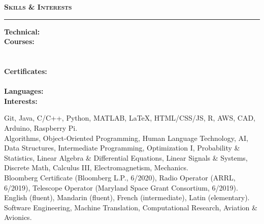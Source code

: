\documentclass[10pt, letterpaper]{article}
\begin{document}
\pagebreak
{\large \textbf{\textsc{Skills \& Interests}}}
\vspace{5pt}
\hrule
{}
\begin{paracol}{2}
\raggedleft
\textbf{Technical:}\\
\textbf{Courses:}\\~\\~\\
\textbf{Certificates:}\\~\\
\textbf{Languages:}\\
\textbf{Interests:}\\
\switchcolumn
\raggedright
Git, Java, C/C++, Python, MATLAB, \LaTeX, HTML/CSS/JS, R, AWS, CAD, Arduino, Raspberry Pi.\\
Algorithms, Object-Oriented Programming, Human Language Technology, AI, Data Structures, Intermediate Programming, Optimization I, Probability \& Statistics, Linear Algebra \& Differential Equations, Linear Signals \& Systems, Discrete Math, Calculus III, Electromagnetism, Mechanics.\\
Bloomberg Certificate (Bloomberg L.P., 6/2020), Radio Operator (ARRL, 6/2019), Telescope Operator (Maryland Space Grant Consortium, 6/2019).\\
English (fluent), Mandarin (fluent), French (intermediate), Latin (elementary).\\
Software Engineering, Machine Translation, Computational Research, Aviation \& Avionics.\\
\end{paracol}
\end{document}
